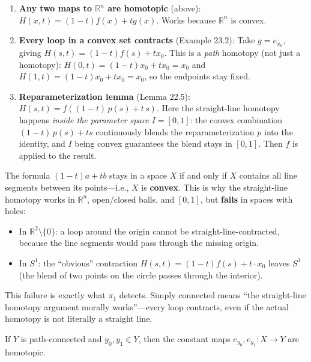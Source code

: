 \documentclass[11pt]{report}
\begin{document}
\begin{enumerate}
    \item \textbf{Any two maps to $\mathbb{R}^n$ are homotopic} (above): $H(x, t) = (1-t)f(x) + tg(x)$. Works because $\mathbb{R}^n$ is convex.
    
    \item \textbf{Every loop in a convex set contracts} (Example 23.2): Take $g = e_{x_0}$, giving $H(s, t) = (1-t)f(s) + tx_0$. This is a \emph{path} homotopy (not just a homotopy): $H(0, t) = (1-t)x_0 + tx_0 = x_0$ and $H(1, t) = (1-t)x_0 + tx_0 = x_0$, so the endpoints stay fixed.
    
    \item \textbf{Reparameterization lemma} (Lemma 22.5): $H(s, t) = f((1-t)\,p(s) + t\,s)$. Here the straight-line homotopy happens \emph{inside the parameter space} $I = [0,1]$: the convex combination $(1-t)\,p(s) + ts$ continuously blends the reparameterization $p$ into the identity, and $I$ being convex guarantees the blend stays in $[0, 1]$. Then $f$ is applied to the result.
\end{enumerate}

\begin{rembox}
The formula $(1-t)a + tb$ stays in a space $X$ if and only if $X$ contains all line segments between its points---i.e., $X$ is \textbf{convex}. This is why the straight-line homotopy works in $\mathbb{R}^n$, open/closed balls, and $[0,1]$, but \textbf{fails} in spaces with holes:
\begin{itemize}[nosep]
    \item In $\mathbb{R}^2 \setminus \{0\}$: a loop around the origin cannot be straight-line-contracted, because the line segments would pass through the missing origin.
    \item In $S^1$: the ``obvious'' contraction $H(s,t) = (1-t)f(s) + t \cdot x_0$ leaves $S^1$ (the blend of two points on the circle passes through the interior).
\end{itemize}
This failure is exactly what $\pi_1$ detects. Simply connected means ``the straight-line homotopy argument morally works''---every loop contracts, even if the actual homotopy is not literally a straight line.
\end{rembox}

\begin{propbox}
If $Y$ is path-connected and $y_0, y_1 \in Y$, then the constant maps $e_{y_0}, e_{y_1}: X \to Y$ are homotopic.
\end{propbox}
\end{document}
